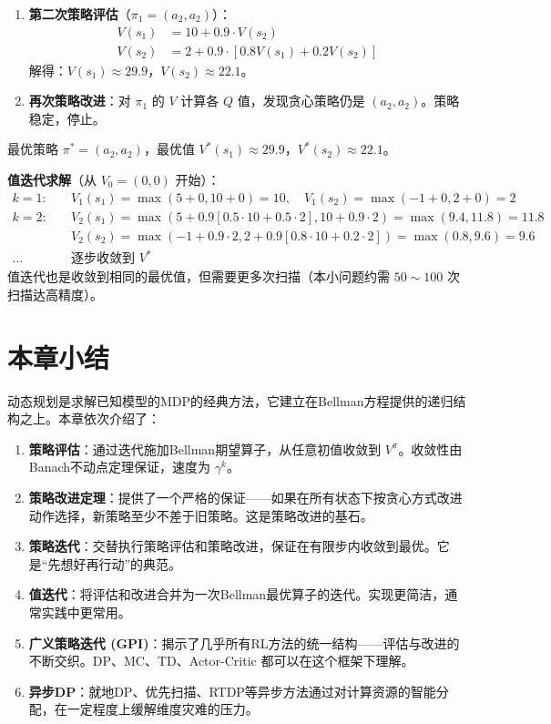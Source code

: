 \begin{example}
\begin{enumerate}
    \item \textbf{第二次策略评估}（$\pi_1 = (a_2, a_2)$）：
    \begin{align*}
    V(s_1) &= 10 + 0.9 \cdot V(s_2) \\
    V(s_2) &= 2 + 0.9 \cdot [0.8 V(s_1) + 0.2 V(s_2)]
    \end{align*}
    解得：$V(s_1) \approx 29.9$，$V(s_2) \approx 22.1$。
    
    \item \textbf{再次策略改进}：对 $\pi_1$ 的 $V$ 计算各 $Q$ 值，发现贪心策略仍是 $(a_2, a_2)$。策略稳定，停止。
\end{enumerate}

最优策略 $\pi^{*} = (a_2, a_2)$，最优值 $V^{*}(s_1) \approx 29.9$，$V^{*}(s_2) \approx 22.1$。

\textbf{值迭代求解}（从 $V_0 = (0, 0)$ 开始）：
\begin{align*}
k=1:&\quad V_1(s_1) = \max(5 + 0, 10 + 0) = 10, \quad V_1(s_2) = \max(-1 + 0, 2 + 0) = 2 \\
k=2:&\quad V_2(s_1) = \max(5 + 0.9[0.5\cdot10+0.5\cdot2], 10 + 0.9\cdot2) = \max(9.4, 11.8) = 11.8 \\
     &\quad V_2(s_2) = \max(-1 + 0.9\cdot2, 2 + 0.9[0.8\cdot10+0.2\cdot2]) = \max(0.8, 9.6) = 9.6 \\
\dots &\quad \text{逐步收敛到 } V^{*}
\end{align*}
值迭代也是收敛到相同的最优值，但需要更多次扫描（本小问题约需 $50\sim100$ 次扫描达高精度）。
\end{example}

\section{本章小结}

动态规划是求解已知模型的MDP的经典方法，它建立在Bellman方程提供的递归结构之上。本章依次介绍了：

\begin{enumerate}
    \item \textbf{策略评估}：通过迭代施加Bellman期望算子，从任意初值收敛到 $V^{\pi}$。收敛性由Banach不动点定理保证，速度为 $\gamma^k$。
    \item \textbf{策略改进定理}：提供了一个严格的保证——如果在所有状态下按贪心方式改进动作选择，新策略至少不差于旧策略。这是策略改进的基石。
    \item \textbf{策略迭代}：交替执行策略评估和策略改进，保证在有限步内收敛到最优。它是``先想好再行动''的典范。
    \item \textbf{值迭代}：将评估和改进合并为一次Bellman最优算子的迭代。实现更简洁，通常实践中更常用。
    \item \textbf{广义策略迭代 (GPI)}：揭示了几乎所有RL方法的统一结构——评估与改进的不断交织。DP、MC、TD、Actor-Critic 都可以在这个框架下理解。
    \item \textbf{异步DP}：就地DP、优先扫描、RTDP等异步方法通过对计算资源的智能分配，在一定程度上缓解维度灾难的压力。
\end{enumerate}

